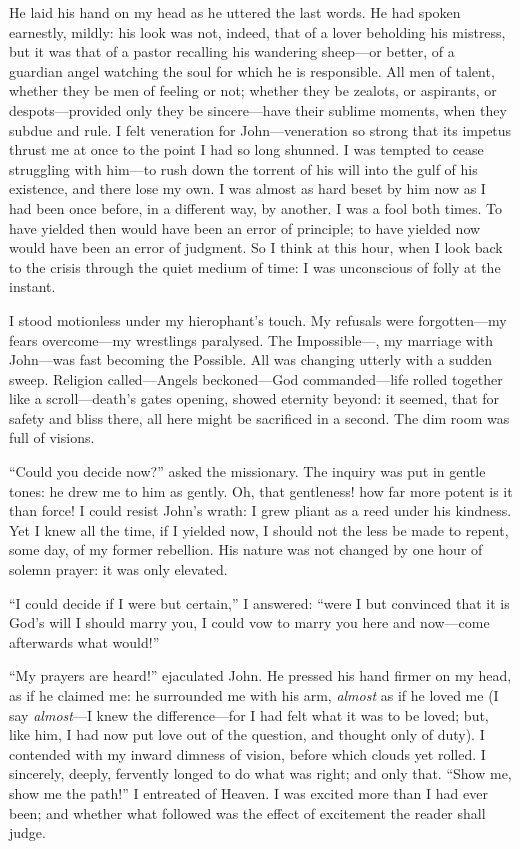 He laid his hand on my head as he uttered the last words. He had spoken
earnestly, mildly: his look was not, indeed, that of a lover beholding
his mistress, but it was that of a pastor recalling his wandering
sheep---or better, of a guardian angel watching the soul for which he is
responsible. All men of talent, whether they be men of feeling or not;
whether they be zealots, or aspirants, or despots---provided only they
be sincere---have their sublime moments, when they subdue and rule. I
felt veneration for \St{} John---veneration so strong that its impetus
thrust me at once to the point I had so long shunned. I was tempted to
cease struggling with him---to rush down the torrent of his will into
the gulf of his existence, and there lose my own. I was almost as hard
beset by him now as I had been once before, in a different way, by
another. I was a fool both times. To have yielded then would have been
an error of principle; to have yielded now would have been an error of
judgment. So I think at this hour, when I look back to the crisis
through the quiet medium of time: I was unconscious of folly at the
instant.

I stood motionless under my hierophant's touch. My refusals were
forgotten---my fears overcome---my wrestlings paralysed. The
Impossible---\emph{\ie}, my marriage with \St{} John---was fast becoming
the Possible. All was changing utterly with a sudden sweep. Religion
called---Angels beckoned---God commanded---life rolled together like a
scroll---death's gates opening, showed eternity beyond: it seemed, that
for safety and bliss there, all here might be sacrificed in a second.
The dim room was full of visions.

\enquote{Could you decide now?} asked the missionary. The inquiry was
put in gentle tones: he drew me to him as gently. Oh, that gentleness!
how far more potent is it than force! I could resist \St{} John's wrath:
I grew pliant as a reed under his kindness. Yet I knew all the time, if
I yielded now, I should not the less be made to repent, some day, of my
former rebellion. His nature was not changed by one hour of solemn
prayer: it was only elevated.

\enquote{I could decide if I were but certain,} I answered:
\enquote{were I but convinced that it is God's will I should marry you,
	I could vow to marry you here and now---come afterwards what would!}

\enquote{My prayers are heard!} ejaculated \St{} John. He pressed his
hand firmer on my head, as if he claimed me: he surrounded me with his
arm, \emph{almost} as if he loved me (I say \emph{almost}---I knew the
difference---for I had felt what it was to be loved; but, like him, I
had now put love out of the question, and thought only of duty). I
contended with my inward dimness of vision, before which clouds yet
rolled. I sincerely, deeply, fervently longed to do what was right; and
only that. \enquote{Show me, show me the path!} I entreated of Heaven.
I was excited more than I had ever been; and whether what followed was
the effect of excitement the reader shall judge.


